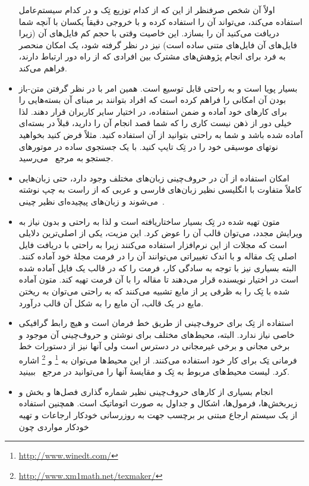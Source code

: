 \begin{itemize}
اولاً آن شخص صرفنظر از این که از کدام توزیع تِک و در کدام سیستم‌عامل 
استفاده می‌کند، می‌تواند آن را استفاده کرده و با خروجی دقیقاً یکسان با آنچه شما دریافت می‌کنید
آن را بسازد. این خاصیت وقتی با حجم کم فایل‌های آن (زیرا فایل‌های آن فایل‌های متنی ساده است)
 نیز در نظر گرفته شود، یک امکان
منحصر به فرد برای انجام پژوهش‌های مشترک بین افرادی که از راه دور ارتباط دارند، فراهم
می‌کند.
\item بسیار پویا  است و به راحتی قابل توسیع است. همین امر با در نظر گرفتن متن-باز
بودن آن امکانی را فراهم کرده است که افراد بتوانند بر مبنای آن بسته‌هایی را برای
کارهای خود آماده و ضمن استفاده، در اختیار سایر کاربران قرار دهند. لذا خیلی دور از ذهن
نیست کاری را که شما قصد انجام آن را دارید، قبلاً در بسته‌ای آماده شده باشد و شما
به راحتی بتوانید از آن استفاده کنید. مثلاً فرض کنید بخواهید نوتهای موسیقی خود را
در تِک تایپ کنید. با یک جستجوی ساده در موتورهای جستجو به مرجع~\cite{Music}
می‌رسید.
\item امکان استفاده از آن در حروف‌چینی زبان‌های مختلف وجود دارد، حتی زبان‌هایی
کاملاً متفاوت با انگلیسی نظیر زبان‌های فارسی و عربی که از راست به چپ نوشته می‌شوند
و زبان‌های پیچیده‌ای نظیر چینی~\cite{Art}.
\item متون تهیه شده در تِک بسیار ساختاریافته است و لذا به راحتی و بدون نیاز به 
ویرایش مجدد، می‌توان قالب آن را عوض کرد. این مزیت، یکی از اصلی‌ترین دلایلی است
که مجلات از این نرم‌افزار استفاده می‌کنند زیرا به راحتی با دریافت فایل اصلی تِک مقاله
و با اندک تغییراتی می‌توانند آن را در فرمت مجلۀ خود آماده کنند. البته بسیاری نیز با توجه
به سادگی کار، فرمت را که در قالب یک فایل آماده شده است در اختیار نویسنده قرار می‌دهند
تا مقاله را با آن فرمت تهیه کند. متون آماده شده با تِک را به ظرفی پر از مایع تشبیه
می‌کنند که به راحتی می‌توان به ریختن مایع در یک قالب، آن مایع را به شکل آن 
 قالب درآورد.
 \item استفاده از تِک برای حروف‌چینی از طریق خط فرمان است و هیچ رابط گرافیکی
 خاصی نیاز ندارد. البته، محیط‌های مختلف برای نوشتن و حروف‌چینی آن موجود و برخی
 مجانی و برخی غیرمجانی در دسترس است ولی آنها نیز از دستورات خط فرمانی
 تِک برای کار خود استفاده می‌کنند. از این محیط‌ها می‌توان به 
 \footnote{\url{http://www.winedt.com/}}
 و \footnote{\url{http://www.xm1math.net/texmaker/}}
 اشاره کرد. لیست محیط‌های مربوط به تِک و مقایسۀ آنها 
 را می‌توانید در مرجع~\cite{Editors} ببینید.
 \item انجام بسیاری از کارهای حروف‌چینی  نظیر شماره گذاری
 فصل‌ها و بخش و زیربخش‌ها، فرمول‌ها، اشکال و جداول به صورت اتوماتیک است.
همچنین استفاده از یک سیستم ارجاع 
 مبتنی بر برچسب جهت به روزرسانی خودکار ارجاعات و تهیه خودکار مواردی چون

\end{itemize}
